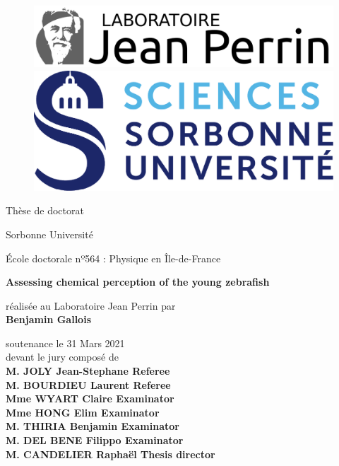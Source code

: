 \thispagestyle{empty}
	
	\begin{figure}[ht]
			\includegraphics[scale=0.5]{cover/ljp.png}
	   \endminipage
			\includegraphics[scale=0.5]{cover/su.png}
		\endminipage
	\end{figure}
	
	\begin{center}
	\vspace{0.3cm}
	\LARGE
	Thèse de doctorat 
	
	\vspace{.1cm}
	\LARGE
	Sorbonne Université

	\vspace{.2cm}
	\Large
  École doctorale nº564 : Physique en Île-de-France
	
	\vspace{1cm}	
	\Large
	\textbf{Assessing chemical perception of the young zebrafish}

	\vspace{1cm}
	\normalsize	
	réalisée au Laboratoire Jean Perrin par \\
	\vspace{.2cm}
	\large
	\textbf{Benjamin Gallois}
	
	\vspace{.3cm}
	\normalsize	
	soutenance le 31 Mars 2021 \\
	\vspace{.1cm}
	\normalsize	
	devant le jury composé de \\
	\vspace{.3cm}
	\large
	\textbf{M. JOLY Jean-Stephane \hfill Referee} \\
	\textbf{M. BOURDIEU Laurent \hfill Referee} \\
	\textbf{Mme WYART Claire \hfill Examinator} \\
	\textbf{Mme HONG Elim \hfill Examinator} \\
	\textbf{M. THIRIA Benjamin \hfill Examinator} \\
	\textbf{M. DEL BENE Filippo \hfill Examinator} \\
	\textbf{M. CANDELIER Raphaël \hfill Thesis director} \\
	
	\vspace{1.3cm}
	\end{center}
